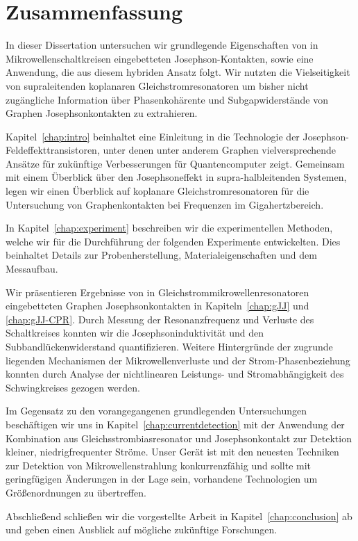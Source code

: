 
\chapter*{Zusammenfassung}

{%
In dieser Dissertation untersuchen wir grundlegende Eigenschaften von in Mikrowellenschaltkreisen eingebetteten Josephson-Kontakten, sowie eine Anwendung, die aus diesem hybriden Ansatz folgt.
%
Wir nutzten die Vielseitigkeit von supraleitenden koplanaren Gleichstromresonatoren um bisher nicht zugängliche Information über Phasenkohärente und Subgapwiderstände von Graphen Josephsonkontakten zu extrahieren.

\noindent \newline
Kapitel~\ref{chap:intro} beinhaltet eine Einleitung in die Technologie der Josephson-Feldeffekttransistoren, unter denen unter anderem Graphen vielversprechende Ansätze für zukünftige Verbesserungen für Quantencomputer zeigt.
%
Gemeinsam mit einem Überblick über den Josephsoneffekt in supra-halbleitenden Systemen, legen wir einen Überblick auf koplanare Gleichstromresonatoren für die Untersuchung von Graphenkontakten bei Frequenzen im Gigahertzbereich.

\noindent \newline
In Kapitel~\ref{chap:experiment} beschreiben wir die experimentellen Methoden, welche wir für die Durchführung der folgenden Experimente entwickelten.
%
Dies beinhaltet Details zur Probenherstellung, Materialeigenschaften und dem Messaufbau.

\noindent \newline
Wir präsentieren Ergebnisse von in Gleichstrommikrowellenresonatoren eingebetteten Graphen Josephsonkontakten in Kapiteln~\ref{chap:gJJ} und \ref{chap:gJJ-CPR}.
%
Durch Messung der Resonanzfrequenz und Verluste des Schaltkreises konnten wir die Josephsoninduktivität und den Subbandlückenwiderstand quantifizieren.
%
Weitere Hintergründe der zugrunde liegenden Mechanismen der Mikrowellenverluste und der Strom-Phasenbeziehung konnten durch Analyse der nichtlinearen Leistungs- und Stromabhängigkeit des Schwingkreises gezogen werden.

\noindent \newline
Im Gegensatz zu den vorangegangenen grundlegenden Untersuchungen beschäftigen wir uns in Kapitel~\ref{chap:currentdetection} mit der Anwendung der Kombination aus Gleichsstrombiasresonator und Josephsonkontakt zur Detektion kleiner, niedrigfrequenter Ströme.
%
Unser Gerät ist mit den neuesten Techniken zur Detektion von Mikrowellenstrahlung konkurrenzfähig und sollte mit geringfügigen Änderungen in der Lage sein, vorhandene Technologien um Größenordnungen zu übertreffen.

\noindent \newline
Abschließend schließen wir die vorgestellte Arbeit in Kapitel~\ref{chap:conclusion} ab und geben einen Ausblick auf mögliche zukünftige Forschungen.

}

